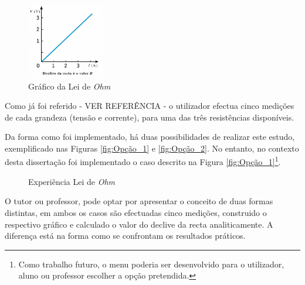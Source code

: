 \begin{figure}[hbtp]
	\centering
	\includegraphics[width=0.3\textwidth]{figures/grafico_Ohm.png}
	\caption{Gráfico da Lei de \textit{Ohm}}
	\label{fig:graphohmrepetido}
\end{figure}

Como já foi referido - VER REFERÊNCIA - o utilizador efectua cinco medições de cada grandeza (tensão e corrente), para uma das três resistências disponíveis. 

Da forma como foi implementado, há duas possibilidades de realizar este estudo, exemplificado nas Figuras \ref{fig:Opção_1} e \ref{fig:Opção_2}. No entanto, no contexto desta dissertação foi  implementado o caso descrito na Figura \ref{fig:Opção_1}\footnote{Como trabalho futuro, o menu poderia ser desenvolvido para o utilizador, aluno ou professor escolher a opção pretendida.}. 

\begin{figure}[hbtp]
	\centering%
		\centering
		\qquad
		\caption{Experiência Lei de \textit{Ohm}}%
		\label{fig:experienciaOHM}%
	\end{figure}
O tutor ou professor, pode optar por apresentar o conceito de duas formas distintas, em ambos os casos são efectuadas cinco medições, construido o respectivo gráfico e calculado o valor do declive da recta analiticamente. A diferença está na forma como se confrontam os resultados práticos. 

